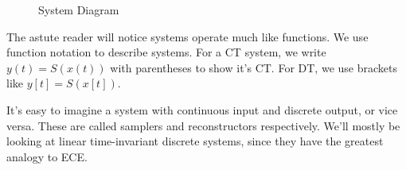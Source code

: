 \begin{figure}[h]
    \centering
    \caption{System Diagram}
    \label{System diagram}
\end{figure}

The astute reader will notice systems operate much like functions.
We use function notation to describe systems. For a CT system, we
write $y(t) = S(x(t))$ with parentheses to show it's CT. For DT,
we use brackets like $y[t] = S(x[t])$.

It's easy to imagine a system with continuous input and discrete output,
or vice versa. These are called samplers and reconstructors respectively.
We'll mostly be looking at linear time-invariant discrete systems, since they have the greatest
analogy to ECE.